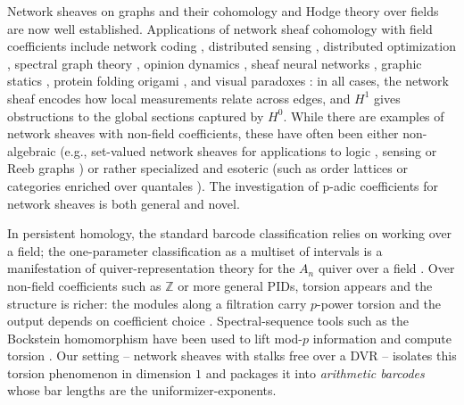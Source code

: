 \documentclass[11pt]{amsart}
\theoremstyle{plain}
\theoremstyle{definition}
\begin{document}
Network sheaves on graphs and their cohomology and Hodge theory over fields are now well established.
Applications of network sheaf cohomology with field coefficients include network coding \cite{GhristHiraoka2011_NOLTA_NetworkCodingSheaves}, 
distributed sensing \cite{HansenGhrist2019_ICASSP_LearnSheafLaplacians}, distributed optimization \cite{HansenGhrist2019_Allerton_SheafHomologicalOpt}, spectral graph theory \cite{Hansen_2019}, 
opinion dynamics \cite{hansen2021opinion}, sheaf neural networks \cite{hansen2020sheaf,BodnarEtAl2022_NeuralSheafDiffusion}, graphic statics \cite{cooperband2023cosheaf,cooperband2023homological}, protein folding \cite{HayesEtAl2025_PersistentSheafLaplacianProtein} origami \cite{CooperbandGhrist_2025_OrigamiCosheaf}, 
and visual paradoxes \cite{GhristCooperband_2025_ObstructionsToReality}: in all cases, the network sheaf encodes how local measurements relate 
across edges, and $H^1$ gives obstructions to the global sections captured by $H^0$. While there
are examples of network sheaves with non-field coefficients, these have often been either
non-algebraic (e.g., set-valued network sheaves for applications to logic \cite{Goguen1992Sheaves}, sensing \cite{Robinson2017_SheavesSensorIntegration} or Reeb graphs 
 \cite{deSilva2016Categorified}) or rather specialized and esoteric (such as order lattices \cite{GhristRiess2022_TarskiLaplacian,riess2022diffusion} or categories enriched over quantales
 \cite{GhristLopezNorthRiess_2025_CategoricalDiffusion}). The investigation of p-adic coefficients for network sheaves is both general and novel. 

In persistent homology, the standard barcode classification relies on working over a field; the one-parameter classification as a multiset of intervals is a manifestation of quiver-representation theory for the $A_n$ quiver over a field \cite{CarlssonDeSilva2010,Oudot2015,CrawleyBoevey2015}. Over non-field coefficients such as $\mathbb{Z}$ or more general PIDs, torsion appears and the structure is richer: the modules along a filtration carry $p$-power torsion and the output depends on coefficient choice \cite{EdelsbrunnerLetscherZomorodian2002,ZomorodianCarlsson2005,RomeroSinchiTorres2016,ObayashiYoshiwaki2023}. Spectral-sequence tools such as the Bockstein homomorphism have been used to lift mod-$p$ information and compute torsion \cite{RenWuWu2017}. Our setting -- network sheaves with stalks free over a DVR -- isolates this torsion phenomenon in dimension $1$ and packages it into \emph{arithmetic barcodes} whose bar lengths are the uniformizer-exponents.
\end{document}
